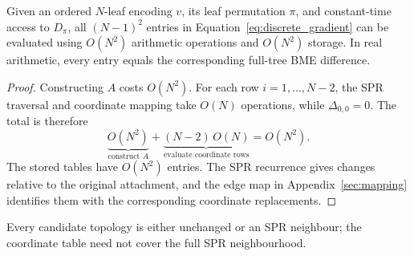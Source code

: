 \begin{proposition}
\label{prop:quadratic}
Given an ordered $N$-leaf encoding $v$, its leaf permutation $\pi$, and constant-time access to $D_\pi$, all $(N-1)^2$ entries in Equation~\eqref{eq:discrete_gradient} can be evaluated using $O(N^2)$ arithmetic operations and $O(N^2)$ storage.
In real arithmetic, every entry equals the corresponding full-tree BME difference.
\end{proposition}
\begin{proof}
Constructing $A$ costs $O(N^2)$.
For each row $i=1,\ldots,N-2$, the SPR traversal and coordinate mapping take $O(N)$ operations, while $\Delta_{0,0}=0$.
The total is therefore
\[
 \underbrace{O(N^2)}_{\text{construct }A}
 +\underbrace{(N-2)\,O(N)}_{\text{evaluate coordinate rows}}
 =O(N^2).
\]
The stored tables have $O(N^2)$ entries.
The SPR recurrence gives changes relative to the original attachment, and the edge map in Appendix~\ref{sec:mapping} identifies them with the corresponding coordinate replacements.
\end{proof}

Every candidate topology is either unchanged or an SPR neighbour; the coordinate table need not cover the full SPR neighbourhood.

